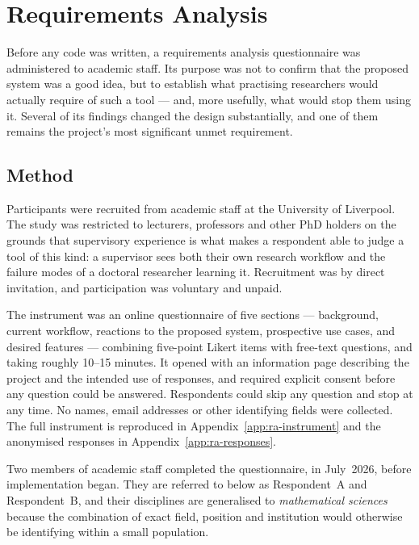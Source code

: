 \chapter{Requirements Analysis}
\label{ch:requirements}


Before any code was written, a requirements analysis questionnaire was administered to
academic staff. Its purpose was not to confirm that the proposed system was a good idea, but
to establish what practising researchers would actually require of such a tool --- and, more
usefully, what would stop them using it. Several of its findings changed the design
substantially, and one of them remains the project's most significant unmet requirement.

\section{Method}

Participants were recruited from academic staff at the University of Liverpool. The study was
restricted to lecturers, professors and other PhD holders on the grounds that supervisory
experience is what makes a respondent able to judge a tool of this kind: a supervisor sees
both their own research workflow and the failure modes of a doctoral researcher learning it.
Recruitment was by direct invitation, and participation was voluntary and unpaid.

The instrument was an online questionnaire of five sections --- background, current workflow,
reactions to the proposed system, prospective use cases, and desired features --- combining
five-point Likert items with free-text questions, and taking roughly 10--15 minutes. It opened
with an information page describing the project and the intended use of responses, and
required explicit consent before any question could be answered. Respondents could skip any
question and stop at any time. No names, email addresses or other identifying fields were
collected. The full instrument is reproduced in Appendix~\ref{app:ra-instrument} and the
anonymised responses in Appendix~\ref{app:ra-responses}.

Two members of academic staff completed the questionnaire, in July~2026, before implementation
began. They are referred to below as Respondent~A and Respondent~B, and their disciplines are
generalised to \emph{mathematical sciences} because the combination of exact field, position
and institution would otherwise be identifying within a small population.

